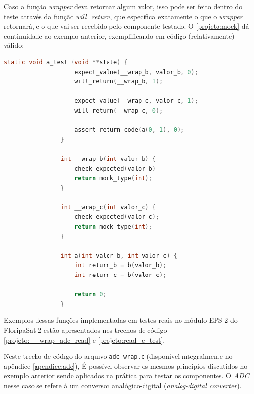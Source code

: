                 Caso a função \textit{wrapper} deva retornar algum valor, isso pode ser feito dentro do teste através da função \textit{will\_return}, que especifica exatamente o que o \textit{wrapper} retornará, e o que vai ser recebido pelo componente testado. O \autoref{projeto:mock} dá continuidade ao exemplo anterior, exemplificando em código (relativamente) válido:
                
                \begin{lstlisting}[language=C, label=projeto:mock, caption=Exemplo de implementação e chamada de \textit{mock objects}]
                static void a_test (void **state) {
                    expect_value(__wrap_b, valor_b, 0);
                    will_return(__wrap_b, 1);
                    
                    expect_value(__wrap_c, valor_c, 1);
                    will_return(__wrap_c, 0);
                    
                    assert_return_code(a(0, 1), 0);
                }
                
                int __wrap_b(int valor_b) {
                    check_expected(valor_b)
                    return mock_type(int);
                }
                
                int __wrap_c(int valor_c) {
                    check_expected(valor_c);
                    return mock_type(int);
                }
                
                int a(int valor_b, int valor_c) {
                    int return_b = b(valor_b);
                    int return_c = b(valor_c);
                    
                    return 0;
                }
                \end{lstlisting}
                
                
                Exemplos dessas funções implementadas em testes reais no módulo EPS 2 do FloripaSat-2 estão apresentados nos trechos de código  \ref{projeto:__wrap_adc_read} e \ref{projeto:read_c_test}. 
                
                
                
                Neste trecho de código do arquivo \texttt{adc\_wrap.c} (disponível integralmente no apêndice \ref{apendice:adc}), É possível observar os mesmos princípios discutidos no exemplo anterior sendo aplicados na prática para testar os componentes. O \textit{ADC} nesse caso se refere à um conversor analógico-digital (\textit{analog-digital converter}).
                
